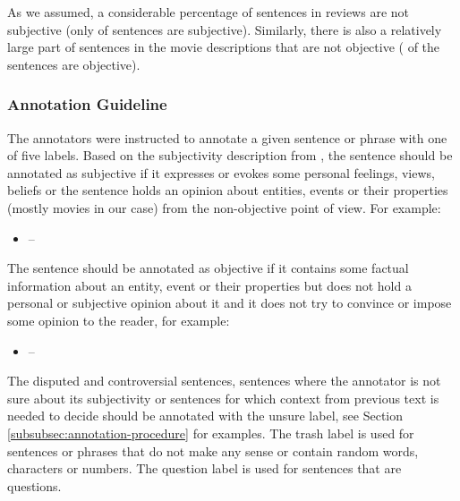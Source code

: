 \documentclass[10pt, a4paper]{article}
\begin{document}
\par As we assumed, a considerable percentage of sentences in reviews are not subjective (only  of sentences are subjective). Similarly, there is also a relatively large part of sentences in the movie descriptions that are not objective ( of the sentences are objective).




\subsubsection{Annotation Guideline}
\label{subsec:annotation-guideline}
The annotators were instructed to annotate a given sentence or phrase with one of five labels. Based on the subjectivity description from \cite{wiebe-etal-1999-development,english-dataset,liu2012sentiment}, the sentence should be annotated as subjective if it expresses or evokes some personal feelings, views, beliefs or the sentence holds an opinion about entities, events or their properties (mostly movies in our case) from the non-objective point of view. For example:
\begin{itemize}
	\small
	\item[] {  -- }
\end{itemize}

\par The sentence should be annotated as objective if it contains some factual information about an entity, event or their properties but does not hold a personal or subjective opinion about it and it does not try to convince or impose some opinion to the reader, for example:
\begin{itemize}
	\small
	\item[] {  -- }
\end{itemize}


\par The disputed and controversial sentences, sentences where the annotator is not sure about its subjectivity or sentences for which context from previous text is needed to decide should be annotated with the unsure label, see Section \ref{subsubsec:annotation-procedure} for examples. The trash label is used for sentences or phrases that do not make any sense or contain random words, characters or numbers. The question label is used for sentences that are questions.
\end{document}
